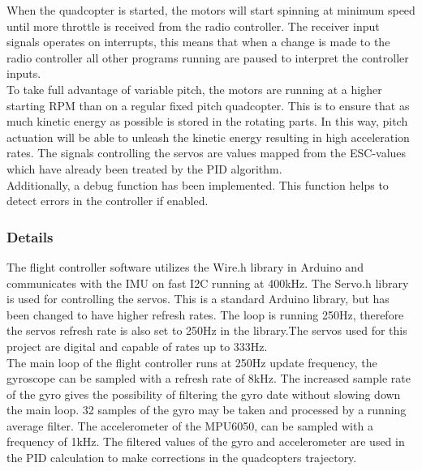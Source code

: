 When the quadcopter is started, the motors will start spinning at minimum speed until more throttle is received from the radio controller. The receiver input signals operates on interrupts, this means that when a change is made to the radio controller all other programs running are paused to interpret the controller inputs.
\\
To take full advantage of variable pitch, the motors are running at a higher starting RPM than on a regular fixed pitch quadcopter. This is to ensure that as much kinetic energy as possible is stored in the rotating parts. In this way, pitch actuation will be able to unleash the kinetic energy resulting in high acceleration rates. The signals controlling the servos are values mapped from the ESC-values which have already been treated by the PID algorithm.\\

Additionally, a debug function has been implemented. This function helps to detect errors in the controller if enabled.

\subsubsection{Details}
The flight controller software utilizes the Wire.h library in Arduino and communicates with the IMU on fast I2C running at 400kHz. The Servo.h library is used for controlling the servos. This is a standard Arduino library, but has been changed to have higher refresh rates. The loop is running 250Hz, therefore the servos refresh rate is also set to 250Hz in the library.The servos used for this project are digital and capable of rates up to 333Hz. \\

The main loop of the flight controller runs at 250Hz update frequency, the gyroscope can be sampled with a refresh rate of 8kHz. The increased sample rate of the gyro gives the possibility of filtering the gyro date without slowing down the main loop. 32 samples of the gyro may be taken and processed by a running average filter. The accelerometer of the MPU6050, can be sampled with a frequency of 1kHz. The filtered values of the gyro and accelerometer are used in the PID calculation to make corrections in the quadcopters trajectory. \\ 



